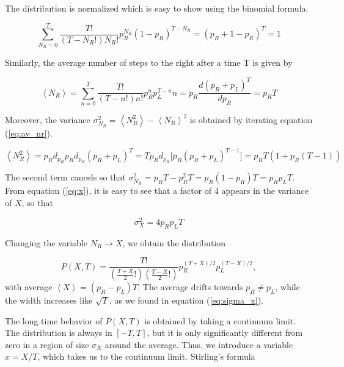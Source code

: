\documentclass[10pt]{article}
\begin{document}
The distribution is normalized which is easy to show using the binomial formula.

\begin{equation}
\sum_{N_R = 0}^T \frac{T!}{(T - N_R !) N_R !} p_R^{N_R} (1 - p_R)^{T - N_R} = (p_R + 1 - p_R)^T = 1
\end{equation}

Similarly, the average number of steps to the right after a time T is given by

\begin{equation}\label{eq:av_nr}
\left\langle N_R \right \rangle = \sum_{n=0}^T \frac{T!}{(T - n !) n !} p_R^n p_L^{T-n} n = p_R \frac{d (p_R + p_L)^T}{d p_R} = p_R T
\end{equation}

Moreover, the variance $\sigma_{N_R}^2 = \left\langle N_R^2 \right \rangle - \left\langle N_R \right \rangle^2$ is obtained by iterating equation (\ref{eq:av_nr}).

\begin{equation}\label{eq:av_nr2}
\left\langle N_R^2 \right \rangle = p_R d_{p_R} p_R d_{p_R} (p_R + p_L)^T = T p_R d_{p_R} \bigg[ p_R (p_R + p_L)^{T-1}\bigg] = p_R T ( 1 + p_R (T-1) )
\end{equation}

The second term cancels so that $\sigma_{N_R}^2 = p_R T - p_R^2 T =  p_R (1- p_R) T = p_R p_L T$. From equation (\ref{eq:x}), it is easy to see that a factor of 4 appears in the variance of $X$, so that

\begin{equation}\label{eq:sigma_x}
\sigma_X^2 = 4 p_R p_L T
\end{equation}

Changing the variable $N_R \rightarrow X$, we obtain the distribution

\begin{equation}
P ( X, T ) = \frac{T!}{(\frac{T+X}{2}!) (\frac{T-X}{2}!)} p_R^{(T+X)/2} p_L^{(T-X)/2} ,
\end{equation}
with average $\left\langle X \right\rangle = (p_R - p_L) T$. The average drifts towards $p_R \neq p_L$, while the width increases like $\sqrt{T}$, as we found in equation (\ref{eq:sigma_x}).

The long time behavior of $P (X, T)$ is obtained by taking a continuum limit. The distribution is always in $[-T, T]$, but it is only significantly different from zero in a region of size $\sigma_X$ around the average. Thus, we introduce a variable $x = X / T$, which takes us to the continuum limit. Stirling's formula
\end{document}
